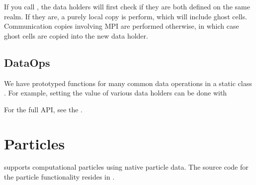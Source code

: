 \documentclass[letterpaper,10pt,english]{sphinxmanual}
\begin{document}
\sphinxAtStartPar
If you call , the data holders will first check if they are both defined on the same realm.
If they are, a purely local copy is perform, which will include ghost cells.
Communication copies involving MPI are performed otherwise, in which case ghost cells are  copied into the new data holder.


\subsection{DataOps}
\label{\detokenize{Source/MeshData:dataops}}\label{\detokenize{Source/MeshData:chap-dataops}}
\sphinxAtStartPar
We have prototyped functions for many common data operations in a static class .
For example, setting the value of various data holders can be done with

\begin{sphinxVerbatim}[commandchars=\\\{\},formatcom=\scriptsize]
 
 
   

 
 
 
\end{sphinxVerbatim}

\sphinxAtStartPar
For the full API, see the .

\sphinxstepscope


\section{Particles}
\label{\detokenize{Source/Particles:particles}}\label{\detokenize{Source/Particles:chap-particles}}\label{\detokenize{Source/Particles::doc}}
\sphinxAtStartPar
{} supports computational particles using native  particle data.
The source code for the particle functionality resides in .
\end{document}

